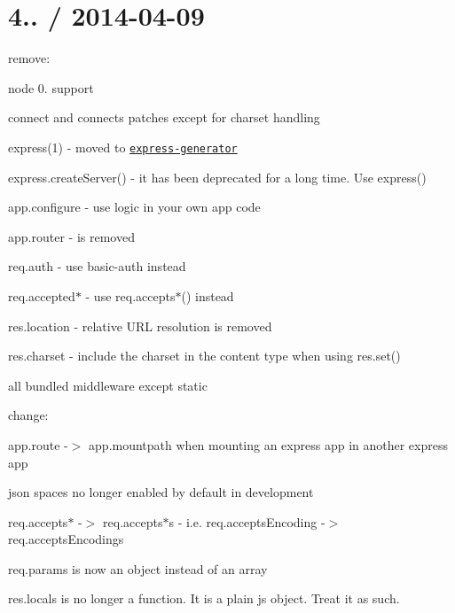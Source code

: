 {\ttfamily \section*{4.. / 2014-\/04-\/09 }}

{\ttfamily }

{\ttfamily 
\begin{DoxyItemize}
\item remove\+:
\begin{DoxyItemize}
\item node 0. support
\item connect and connect\textquotesingle{}s patches except for charset handling
\item express(1) -\/ moved to \href{https://github.com/expressjs/generator}{\tt express-\/generator}
\item {\ttfamily express.\+create\+Server()} -\/ it has been deprecated for a long time. Use {\ttfamily express()}
\item {\ttfamily app.\+configure} -\/ use logic in your own app code
\item {\ttfamily app.\+router} -\/ is removed
\item {\ttfamily req.\+auth} -\/ use {\ttfamily basic-\/auth} instead
\item {\ttfamily req.\+accepted$\ast$} -\/ use {\ttfamily req.\+accepts$\ast$()} instead
\item {\ttfamily res.\+location} -\/ relative U\+RL resolution is removed
\item {\ttfamily res.\+charset} -\/ include the charset in the content type when using {\ttfamily res.\+set()}
\item all bundled middleware except {\ttfamily static}
\end{DoxyItemize}
\item change\+:
\begin{DoxyItemize}
\item {\ttfamily app.\+route} -\/$>$ {\ttfamily app.\+mountpath} when mounting an express app in another express app
\item {\ttfamily json spaces} no longer enabled by default in development
\item {\ttfamily req.\+accepts$\ast$} -\/$>$ {\ttfamily req.\+accepts$\ast$s} -\/ i.\+e. {\ttfamily req.\+accepts\+Encoding} -\/$>$ {\ttfamily req.\+accepts\+Encodings}
\item {\ttfamily req.\+params} is now an object instead of an array
\item {\ttfamily res.\+locals} is no longer a function. It is a plain js object. Treat it as such.

\end{DoxyItemize}
\end{DoxyItemize}}
